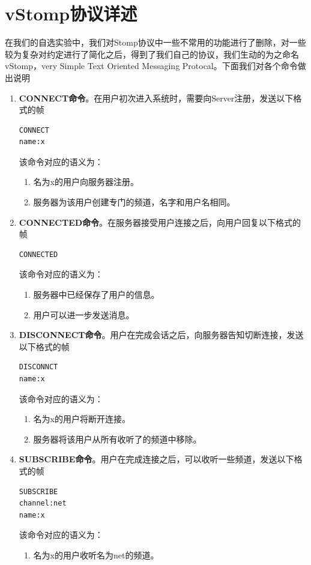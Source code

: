 \documentclass{ctexrep}
\begin{document}
	\section{vStomp协议详述}
	在我们的自选实验中，我们对Stomp协议中一些不常用的功能进行了删除，对一些较为复杂对约定进行了简化之后，得到了我们自己的协议，我们生动的为之命名vStomp，very Simple Text Oriented Messaging Protocal。下面我们对各个命令做出说明
	\begin{enumerate}
		\item \textbf{CONNECT命令}。在用户初次进入系统时，需要向Server注册，发送以下格式的帧\begin{lstlisting}
CONNECT
name:x

		\end{lstlisting}该命令对应的语义为：\begin{enumerate}
			\item 名为x的用户向服务器注册。
			\item 服务器为该用户创建专门的频道，名字和用户名相同。
		\end{enumerate}
	\item \textbf{CONNECTED命令}。在服务器接受用户连接之后，向用户回复以下格式的帧\begin{lstlisting}
CONNECTED
	\end{lstlisting}该命令对应的语义为：\begin{enumerate}
		\item 服务器中已经保存了用户的信息。
		\item 用户可以进一步发送消息。
	\end{enumerate}
		\item  \textbf{DISCONNECT命令}。用户在完成会话之后，向服务器告知切断连接，发送以下格式的帧\begin{lstlisting}
DISCONNCT
name:x
		\end{lstlisting}该命令对应的语义为：\begin{enumerate}
			\item 名为x的用户将断开连接。
			\item 服务器将该用户从所有收听了的频道中移除。
		\end{enumerate}
		\item \textbf{SUBSCRIBE命令}。用户在完成连接之后，可以收听一些频道，发送以下格式的帧\begin{lstlisting}
SUBSCRIBE
channel:net
name:x
		\end{lstlisting}该命令对应的语义为：\begin{enumerate}
			\item 名为x的用户收听名为net的频道。

\end{enumerate}
\end{enumerate}
\end{document}

